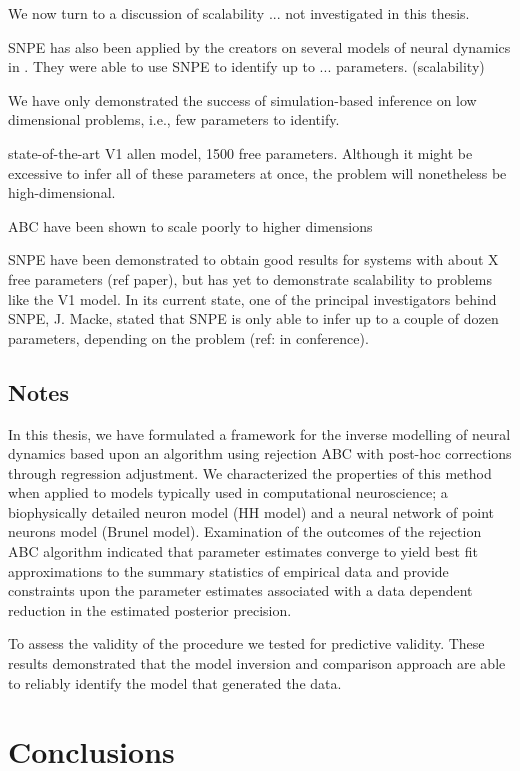 We now turn to a discussion of scalability ... not investigated in this thesis. 

SNPE has also been applied by the creators on several models of neural dynamics in \cite{SNPE_applied}. They were able to use SNPE to identify up to ... parameters. (scalability)


We have only demonstrated the success of simulation-based inference on low dimensional problems, i.e., few parameters to identify. 

state-of-the-art V1 allen model, 1500 free parameters. Although it might be excessive to infer all of these parameters at once, the problem will nonetheless be high-dimensional. 

ABC have been shown to scale poorly to higher dimensions

SNPE have been demonstrated to obtain good results for systems with about X free parameters (ref paper), but has yet to demonstrate scalability to problems like the V1 model. In its current state, one of the principal investigators behind SNPE, J. Macke, stated that SNPE is only able to infer up to a couple of dozen parameters, depending on the problem (ref: in conference).


\section{Notes}

In this thesis, we have formulated a framework for the inverse modelling of neural dynamics based upon an algorithm using rejection ABC with post-hoc corrections through regression adjustment. We characterized the properties of this method when applied to models typically used in computational neuroscience; a biophysically detailed neuron model (HH model) and a neural network of point neurons model (Brunel model). Examination of the outcomes of the rejection ABC algorithm indicated that parameter estimates converge to yield best fit approximations to the summary statistics of empirical data and provide constraints upon the parameter estimates associated with a data dependent reduction in the estimated posterior precision. 

To assess the validity of the procedure we tested for predictive validity. These results demonstrated that the model inversion and comparison approach are able to reliably identify the model that generated the data. 

\chapter{Conclusions}\label{chap:conclusions}

